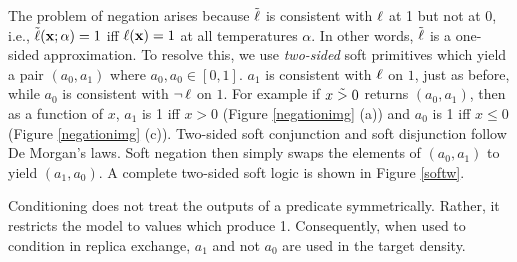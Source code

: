 The problem of negation arises because $\mathrel{\tilde{\operatorname{\ell}}}$ is consistent with $\operatorname{\ell}$ at 1 but not at 0, i.e., $\tilde{\operatorname{\ell}}(\mathbf{x}; \alpha) = 1$ iff $\operatorname{\ell}(\mathbf{x}) = 1$ at all temperatures $\alpha$.
In other words, $\mathrel{\tilde{\operatorname{\ell}}}$ is a one-sided approximation.
To resolve this, we use \emph{two-sided} soft primitives which yield a pair $(a_0, a_1)$ where $a_0, a_0 \in [0, 1]$.
$a_1$ is consistent with $\operatorname{\ell}$ on $1$, just as before, while $a_0$ is consistent with $\neg \operatorname{\ell}$ on $1$.
For example if $x \mathrel{\tilde{>}} 0$ returns $(a_0, a_1)$, then as a function of $x$, $a_1$ is 1 iff $x > 0$ (Figure \ref{negationimg} (a)) and $a_0$ is 1 iff $x \leq 0$ (Figure \ref{negationimg} (c)).
Two-sided soft conjunction and soft disjunction follow De Morgan's laws.
Soft negation then simply swaps the elements of $(a_0, a_1)$ to yield $(a_1, a_0)$.
A complete two-sided soft logic is shown in Figure \ref{softw}.

Conditioning does not treat the outputs of a predicate symmetrically.
Rather, it restricts the model to values which produce 1.
Consequently, when used to condition in replica exchange, $a_1$ and not $a_0$ are used in the target density.




